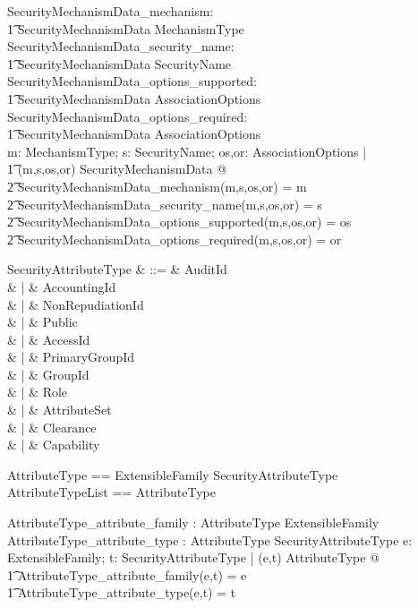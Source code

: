 \begin{axdef}
  SecurityMechanismData\_mechanism: \\
  \t1 SecurityMechanismData \fun MechanismType \\
  SecurityMechanismData\_security\_name: \\
  \t1 SecurityMechanismData \fun SecurityName \\ 
  SecurityMechanismData\_options\_supported: \\
  \t1 SecurityMechanismData \fun AssociationOptions \\ 
  SecurityMechanismData\_options\_required: \\
  \t1 SecurityMechanismData \fun AssociationOptions \\ 
  \where
  \forall m: MechanismType; s: SecurityName; os,or: AssociationOptions | \\
  \t1 (m,s,os,or) \in SecurityMechanismData @ \\
  \t2 SecurityMechanismData\_mechanism(m,s,os,or) = m \\
  \t2 \land SecurityMechanismData\_security\_name(m,s,os,or) = s \\
  \t2 \land SecurityMechanismData\_options\_supported(m,s,os,or) = os \\
  \t2 \land SecurityMechanismData\_options\_required(m,s,os,or) = or \\
\end{axdef}
\begin{syntax}
   SecurityAttributeType & ::= & AuditId\\
  & | & AccountingId\\
  & | & NonRepudiationId\\
  & | & Public\\
  & | & AccessId\\
  & | & PrimaryGroupId\\
  & | & GroupId\\
  & | & Role \\
  & | & AttributeSet\\
  & | & Clearance\\
  & | & Capability \\
\end{syntax}
  
\begin{zed}
  AttributeType == ExtensibleFamily \cross SecurityAttributeType \\
  AttributeTypeList == \seq AttributeType
\end{zed}
\begin{axdef}
  AttributeType\_attribute\_family : AttributeType \fun ExtensibleFamily\\
  AttributeType\_attribute\_type : AttributeType \fun SecurityAttributeType
  \where 
  \forall e: ExtensibleFamily; t: SecurityAttributeType | (e,t) \in
  AttributeType @ \\
  \t1 AttributeType\_attribute\_family(e,t) = e \\
  \t1 \land AttributeType\_attribute\_type(e,t) = t
\end{axdef}

